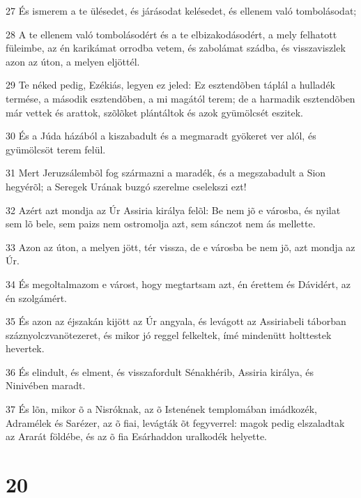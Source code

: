 \par 27 És ismerem a te ülésedet, és járásodat kelésedet, és ellenem való tombolásodat;
\par 28 A te ellenem való tombolásodért és a te elbizakodásodért, a mely felhatott füleimbe,  az én karikámat orrodba vetem, és zabolámat szádba, és visszaviszlek azon az úton, a melyen eljöttél.
\par 29 Te néked pedig, Ezékiás, legyen ez jeled: Ez esztendõben táplál a hulladék termése, a második esztendõben, a mi magától terem; de a harmadik esztendõben már vettek és arattok, szõlõket plántáltok és azok gyümölcsét eszitek.
\par 30 És a Júda házából a kiszabadult és a megmaradt gyökeret ver alól, és gyümölcsöt terem felül.
\par 31 Mert Jeruzsálembõl fog származni a maradék, és a megszabadult a Sion hegyérõl; a Seregek Urának buzgó szerelme cselekszi ezt!
\par 32 Azért azt mondja az Úr Assiria királya felõl: Be nem jõ e városba, és nyilat sem lõ bele, sem paizs nem ostromolja azt, sem sánczot nem ás mellette.
\par 33 Azon az úton, a melyen jött, tér vissza, de e városba be nem jõ, azt mondja az Úr.
\par 34 És megoltalmazom e várost, hogy megtartsam azt, én érettem és Dávidért, az én szolgámért.
\par 35 És azon az éjszakán kijött az Úr angyala, és levágott az Assiriabeli táborban száznyolczvanötezeret, és mikor jó reggel felkeltek, ímé mindenütt holttestek hevertek.
\par 36 És elindult, és elment, és visszafordult Sénakhérib, Assiria királya, és Ninivében maradt.
\par 37 És lõn, mikor õ a Nisróknak, az õ Istenének templomában imádkozék, Adramélek és Sarézer, az õ fiai, levágták õt fegyverrel: magok pedig elszaladtak az Ararát földébe, és az õ fia Esárhaddon uralkodék helyette.

\chapter{20}

